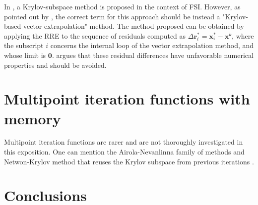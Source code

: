 In \cite{michler_interface_2005}, a Krylov-subspace method is proposed in the context of FSI.
However, as pointed out by \cite{kuttler_vector_2009}, the correct term for this approach should be instead a "Krylov-based vector extrapolation" method.
The method proposed can be obtained by applying the RRE to the sequence of residuals computed as
\(\Delta \mathbf r^*_i = \mathbf x^*_i - \mathbf x^k\), where the subscript \(i\) concerns the internal loop of the vector extrapolation method, and whose limit is \(\mathbf 0\).
\cite{kuttler_vector_2009} argues that these residual differences have unfavorable numerical properties and should be avoided.



\section{Multipoint iteration functions with memory}

Multipoint iteration functions are rarer and are not thoroughly investigated in this exposition.
One can mention the Airola-Nevanlinna family of methods \citep{fang_two_2009} and Netwon-Krylov method that reuses the Krylov subspace from previous iterations \citep{sidi_vector_2017}.

\section{Conclusions}


